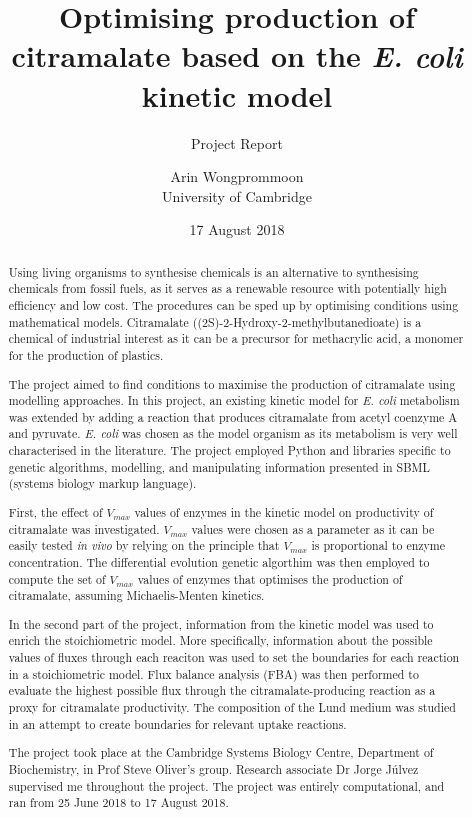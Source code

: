 \documentclass[parskip=full]{scrreprt}
\author{Arin Wongprommoon\\University of Cambridge}
\title{Optimising production of citramalate based on the \emph{E. coli} kinetic model}
\subtitle{Project Report}
\date{17 August 2018}
\begin{document}
\maketitle

\tableofcontents

\begin{abstract}
  Using living organisms to synthesise chemicals is an alternative to synthesising chemicals from fossil fuels, as it serves as a renewable resource with potentially high efficiency and low cost. The procedures can be sped up by optimising conditions using mathematical models. Citramalate ((2S)-2-Hydroxy-2-methylbutanedioate) is a chemical of industrial interest as it can be a precursor for methacrylic acid, a monomer for the production of plastics. 
  
  The project aimed to find conditions to maximise the production of citramalate using modelling approaches. In this project, an existing kinetic model for \emph{E. coli} metabolism was extended by adding a reaction that produces citramalate from acetyl coenzyme A and pyruvate. \emph{E. coli} was chosen as the model organism as its metabolism is very well characterised in the literature. The project employed Python and libraries specific to genetic algorithms, modelling, and manipulating information presented in SBML (systems biology markup language).
  
  First, the effect of $V_{max}$ values of enzymes in the kinetic model on productivity of citramalate was investigated. $V_{max}$ values were chosen as a parameter as it can be easily tested \emph{in vivo} by relying on the principle that $V_{max}$ is proportional to enzyme concentration. The differential evolution genetic algorthim was then employed to compute the set of $V_{max}$ values of enzymes that optimises the production of citramalate, assuming Michaelis-Menten kinetics.
  
  In the second part of the project, information from the kinetic model was used to enrich the stoichiometric model. More specifically, information about the possible values of fluxes through each reaciton was used to set the boundaries for each reaction in a stoichiometric model. Flux balance analysis (FBA) was then performed to evaluate the highest possible flux through the citramalate-producing reaction as a proxy for citramalate productivity. The composition of the Lund medium was studied in an attempt to create boundaries for relevant uptake reactions.
  
  The project took place at the Cambridge Systems Biology Centre, Department of Biochemistry, in Prof Steve Oliver's group. Research associate Dr Jorge J\'ulvez supervised me throughout the project. The project was entirely computational, and ran from 25 June 2018 to 17 August 2018.
\end{abstract}
\end{document}
